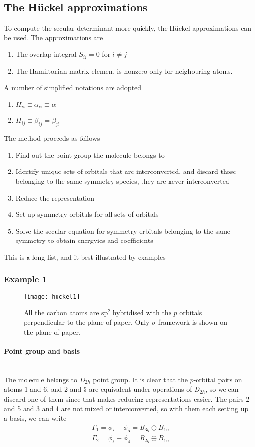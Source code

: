 \subsection{The H{\" u}ckel approximations}
\label{huckel}
To compute the secular determinant more quickly, the H{\" u}ckel approximations can be used. The approximations are
\begin{enumerate}
\item The overlap integral $S_{ij}=0$ for $i\neq j$
\item The Hamiltonian matrix element is nonzero only for neighouring atoms.
\end{enumerate}
A number of simplified notations are adopted:
\begin{enumerate}
\item $H_{ii}\equiv\alpha_{ii}\equiv\alpha$
\item $H_{ij}\equiv\beta_{ij}=\beta_{ji}$
\end{enumerate}
The method proceeds as follows
\begin{enumerate}
	\item Find out the point group the molecule belongs to
	\item Identify unique sets of orbitals that are interconverted, and discard those belonging to the same symmetry species, \ie they are never interconverted
	\item Reduce the representation
	\item Set up symmetry orbitals for all sets of orbitals
	\item Solve the secular equation for symmetry orbitals belonging to the same symmetry to obtain energyies and coefficients
\end{enumerate}
This is a long list, and it best illustrated by examples
\subsubsection{Example 1}
\begin{figure}[H]
	\texttt{[image: huckel1]}
	\centering
	\caption{All the carbon atoms are sp$^2$ hybridised with the $p$ orbitals perpendicular to the plane of paper. Only $\sigma$ framework is shown on the plane of paper.}
	\label{fig:huckel1}
\end{figure}
\paragraph{Point group and basis}~\\
The molecule belongs to $D_{2h}$ point group. It is clear that the $p$-orbital pairs on atoms 1 and 6, and 2 and 5 are equivalent under operations of $D_{2h}$, so we can discard one of them since that makes reducing representations easier. The pairs 2 and 5 and 3 and 4 are not mixed or interconverted, so with them each setting up a basis, we can write
\begin{equation}
\begin{aligned}
&\Gamma_1=\phi_2+\phi_5=B_{3g}\oplus B_{1u}\\
&\Gamma_2=\phi_3+\phi_4=B_{2g}\oplus B_{1u}
\end{aligned}
\end{equation}
